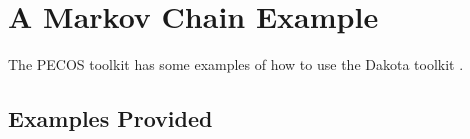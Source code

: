 \chapter{A Markov Chain Example}\label{ch-fp}
\thispagestyle{headings}

The PECOS toolkit has some examples of how to use the Dakota toolkit \cite{dakota}.

\section{Examples Provided}\label{sc-fp-examples}
